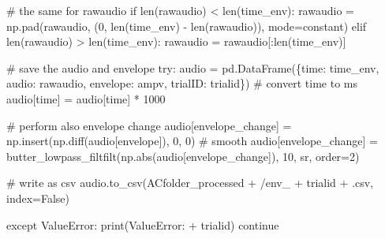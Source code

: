 \documentclass[
  letterpaper,
  DIV=11,
  numbers=noendperiod]{scrreprt}
\newenvironment{Shaded}{\begin{snugshade}}{\end{snugshade}}
\newcommand{\BuiltInTok}[1]{\textcolor[rgb]{0.00,0.23,0.31}{#1}}
\newcommand{\CommentTok}[1]{\textcolor[rgb]{0.37,0.37,0.37}{#1}}
\newcommand{\ControlFlowTok}[1]{\textcolor[rgb]{0.00,0.23,0.31}{#1}}
\newcommand{\DecValTok}[1]{\textcolor[rgb]{0.68,0.00,0.00}{#1}}
\newcommand{\NormalTok}[1]{\textcolor[rgb]{0.00,0.23,0.31}{#1}}
\newcommand{\OperatorTok}[1]{\textcolor[rgb]{0.37,0.37,0.37}{#1}}
\newcommand{\PreprocessorTok}[1]{\textcolor[rgb]{0.68,0.00,0.00}{#1}}
\newcommand{\StringTok}[1]{\textcolor[rgb]{0.13,0.47,0.30}{#1}}
\newcommand{\VariableTok}[1]{\textcolor[rgb]{0.07,0.07,0.07}{#1}}
\begin{document}
\begin{Shaded}
\begin{Highlighting}[]
    \CommentTok{\# the same for rawaudio}
    \ControlFlowTok{if} \BuiltInTok{len}\NormalTok{(rawaudio) }\OperatorTok{\textless{}} \BuiltInTok{len}\NormalTok{(time\_env):}
\NormalTok{        rawaudio }\OperatorTok{=}\NormalTok{ np.pad(rawaudio, (}\DecValTok{0}\NormalTok{, }\BuiltInTok{len}\NormalTok{(time\_env) }\OperatorTok{{-}} \BuiltInTok{len}\NormalTok{(rawaudio)), mode}\OperatorTok{=}\StringTok{\textquotesingle{}constant\textquotesingle{}}\NormalTok{)}
    \ControlFlowTok{elif} \BuiltInTok{len}\NormalTok{(rawaudio) }\OperatorTok{\textgreater{}} \BuiltInTok{len}\NormalTok{(time\_env):}
\NormalTok{        rawaudio }\OperatorTok{=}\NormalTok{ rawaudio[:}\BuiltInTok{len}\NormalTok{(time\_env)]}
    
    \CommentTok{\# save the audio and envelope}
    \ControlFlowTok{try}\NormalTok{:}
\NormalTok{        audio }\OperatorTok{=}\NormalTok{ pd.DataFrame(\{}\StringTok{\textquotesingle{}time\textquotesingle{}}\NormalTok{: time\_env, }\StringTok{\textquotesingle{}audio\textquotesingle{}}\NormalTok{: rawaudio, }\StringTok{\textquotesingle{}envelope\textquotesingle{}}\NormalTok{: ampv, }\StringTok{\textquotesingle{}trialID\textquotesingle{}}\NormalTok{: trialid\})}
        \CommentTok{\# convert time to ms}
\NormalTok{        audio[}\StringTok{\textquotesingle{}time\textquotesingle{}}\NormalTok{] }\OperatorTok{=}\NormalTok{ audio[}\StringTok{\textquotesingle{}time\textquotesingle{}}\NormalTok{] }\OperatorTok{*} \DecValTok{1000}

        \CommentTok{\# perform also envelope change}
\NormalTok{        audio[}\StringTok{\textquotesingle{}envelope\_change\textquotesingle{}}\NormalTok{] }\OperatorTok{=}\NormalTok{ np.insert(np.diff(audio[}\StringTok{\textquotesingle{}envelope\textquotesingle{}}\NormalTok{]), }\DecValTok{0}\NormalTok{, }\DecValTok{0}\NormalTok{)}
        \CommentTok{\# smooth}
\NormalTok{        audio[}\StringTok{\textquotesingle{}envelope\_change\textquotesingle{}}\NormalTok{] }\OperatorTok{=}\NormalTok{ butter\_lowpass\_filtfilt(np.}\BuiltInTok{abs}\NormalTok{(audio[}\StringTok{\textquotesingle{}envelope\_change\textquotesingle{}}\NormalTok{]), }\DecValTok{10}\NormalTok{, sr, order}\OperatorTok{=}\DecValTok{2}\NormalTok{)}
        
        \CommentTok{\# write as csv}
\NormalTok{        audio.to\_csv(ACfolder\_processed }\OperatorTok{+} \StringTok{\textquotesingle{}/env\_\textquotesingle{}} \OperatorTok{+}\NormalTok{ trialid }\OperatorTok{+} \StringTok{\textquotesingle{}.csv\textquotesingle{}}\NormalTok{, index}\OperatorTok{=}\VariableTok{False}\NormalTok{)}

    \ControlFlowTok{except} \PreprocessorTok{ValueError}\NormalTok{:}
        \BuiltInTok{print}\NormalTok{(}\StringTok{\textquotesingle{}ValueError: \textquotesingle{}} \OperatorTok{+}\NormalTok{ trialid)}
        \ControlFlowTok{continue}
\end{Highlighting}
\end{Shaded}
\end{document}
